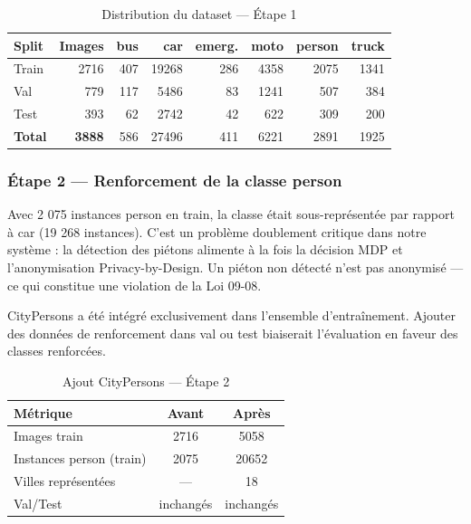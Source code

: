 \begin{table}[H]
\centering
\caption{Distribution du dataset — Étape 1}
\small
\begin{tabularx}{\textwidth}{lrrrrrrr}
\toprule
\textbf{Split} &
\textbf{Images} &
\textbf{bus} &
\textbf{car} &
\textbf{emerg.} &
\textbf{moto} &
\textbf{person} &
\textbf{truck} \\
\midrule
Train & 2716 & 407 & 19268 & 286 &
4358 & 2075 & 1341 \\
Val   & 779  & 117 & 5486  & 83  &
1241 & 507  & 384  \\
Test  & 393  & 62  & 2742  & 42  &
622  & 309  & 200  \\
\midrule
\textbf{Total} & \textbf{3888} &
586 & 27496 & 411 &
6221 & 2891 & 1925 \\
\bottomrule
\end{tabularx}
\label{tab:step1}
\end{table}

\subsubsection{Étape 2 — Renforcement
               de la classe person}

Avec 2 075 instances person en train,
la classe était sous-représentée par
rapport à car (19 268 instances). C'est
un problème doublement critique dans
notre système : la détection des piétons
alimente à la fois la décision MDP et
l'anonymisation Privacy-by-Design. Un
piéton non détecté n'est pas anonymisé
— ce qui constitue une violation de la
Loi 09-08.

CityPersons a été intégré exclusivement
dans l'ensemble d'entraînement. Ajouter
des données de renforcement dans val
ou test biaiserait l'évaluation en
faveur des classes renforcées.

\begin{table}[H]
\centering
\caption{Ajout CityPersons — Étape 2}
\begin{tabularx}{\textwidth}{lcc}
\toprule
\textbf{Métrique} &
\textbf{Avant} &
\textbf{Après} \\
\midrule
Images train & 2716 & 5058 \\
Instances person (train) &
2075 & 20652 \\
Villes représentées & — & 18 \\
Val/Test & inchangés & inchangés \\
\bottomrule
\end{tabularx}
\label{tab:step2}
\end{table}

